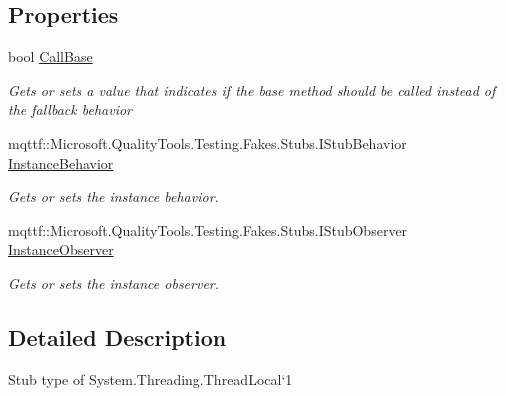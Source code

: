 \subsection*{Properties}
\begin{DoxyCompactItemize}
\item 
bool \hyperlink{class_system_1_1_threading_1_1_fakes_1_1_stub_thread_local_3_01_t_01_4_ab0d25c943fa377593b7e346e67d48cc9}{Call\-Base}
\begin{DoxyCompactList}\small\item\em Gets or sets a value that indicates if the base method should be called instead of the fallback behavior\end{DoxyCompactList}\item 
mqttf\-::\-Microsoft.\-Quality\-Tools.\-Testing.\-Fakes.\-Stubs.\-I\-Stub\-Behavior \hyperlink{class_system_1_1_threading_1_1_fakes_1_1_stub_thread_local_3_01_t_01_4_a8745233d5bfe9cde76de98e4a7ebd5a4}{Instance\-Behavior}
\begin{DoxyCompactList}\small\item\em Gets or sets the instance behavior.\end{DoxyCompactList}\item 
mqttf\-::\-Microsoft.\-Quality\-Tools.\-Testing.\-Fakes.\-Stubs.\-I\-Stub\-Observer \hyperlink{class_system_1_1_threading_1_1_fakes_1_1_stub_thread_local_3_01_t_01_4_a3f3c39f0cbfa8381c001e2d8ee5498cc}{Instance\-Observer}
\begin{DoxyCompactList}\small\item\em Gets or sets the instance observer.\end{DoxyCompactList}\end{DoxyCompactItemize}


\subsection{Detailed Description}
Stub type of System.\-Threading.\-Thread\-Local`1



